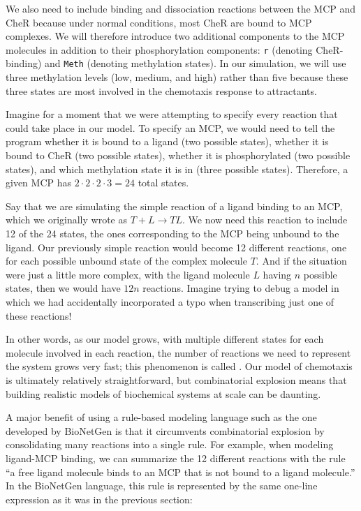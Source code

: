 We also need to include binding and dissociation reactions between the MCP and CheR because under normal conditions, most CheR are bound to MCP complexes. We will therefore introduce two additional components to the MCP molecules in addition to their phosphorylation components: \texttt{r} (denoting CheR-binding) and \texttt{Meth} (denoting methylation states). In our simulation, we will use three methylation levels (low, medium, and high) rather than five because these three states are most involved in the chemotaxis response to attractants.

Imagine for a moment that we were attempting to specify every reaction that could take place in our model. To specify an MCP, we would need to tell the program whether it is bound to a ligand (two possible states), whether it is bound to CheR (two possible states), whether it is phosphorylated (two possible states), and which methylation state it is in (three possible states). Therefore, a given MCP has $2 \cdot 2 \cdot 2 \cdot 3 = 24$ total states.

Say that we are simulating the simple reaction of a ligand binding to an MCP, which we originally wrote as $T + L \rightarrow TL$. We now need this reaction to include 12 of the 24 states, the ones corresponding to the MCP being unbound to the ligand. Our previously simple reaction would become 12 different reactions, one for each possible unbound state of the complex molecule $T$. And if the situation were just a little more complex, with the ligand molecule $L$ having $n$ possible states, then we would have $12n$ reactions. Imagine trying to debug a model in which we had accidentally incorporated a typo when transcribing just one of these reactions!

In other words, as our model grows, with multiple different states for each molecule involved in each reaction, the number of reactions we need to represent the system grows very fast; this phenomenon is called . Our model of chemotaxis is ultimately relatively straightforward, but combinatorial explosion means that building realistic models of biochemical systems at scale can be daunting.

A major benefit of using a rule-based modeling language such as the one developed by BioNetGen is that it circumvents combinatorial explosion by consolidating many reactions into a single rule. For example, when modeling ligand-MCP binding, we can summarize the 12 different reactions with the rule ``a free ligand molecule binds to an MCP that is not bound to a ligand molecule.'' In the BioNetGen language, this rule is represented by the same one-line expression as it was in the previous section:\\

